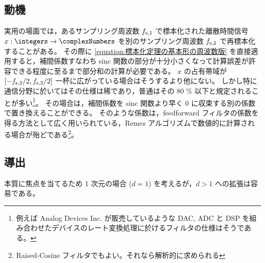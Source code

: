         \subsection{動機}
            実用の場面では，あるサンプリング周波数 $f_{\text{s},1}$ で標本化された離散時間信号 $x:\integers\to\complexNumbers$ を別のサンプリング周波数 $f_{\text{s},2}$ で再標本化することがある。
            その際に \cref{equation:標本化定理の基本形の周波数版} を直接適用すると，補間係数すなわち sinc 関数の部分が十分小さくなって計算誤差が許容できる程度に至るまで部分和の計算が必要である。
            $x$ の占有帯域が $[-f_{\text{s},2}/2,f_{\text{s},2}/2]$ 一杯に広がっている場合はそうするより他にない。
            しかし特に通信分野に於いてはその仕様は稀であり，普通はその 80 \% 以下と規定されることが多い\footnote{例えば Analog Devices Inc. が販売しているような DAC, ADC と DSP を組み合わせたデバイスのレート変換処理に於けるフィルタの仕様はそうである。}。
            その場合は，補間係数を sinc 関数より早く 0 に収束する別の係数で置き換えることができる。
            そのような係数は，feedforward フィルタの係数を得る方法として広く用いられている，Remez アルゴリズムで数値的に計算される場合が殆どである\footnote{Raised-Cosine フィルタでもよい。それなら解析的に求められる}。
        \subsection{導出}
            本質に焦点を当てるため 1 次元の場合 ($d=1$) を考えるが，$d>1$ への拡張は容易である。